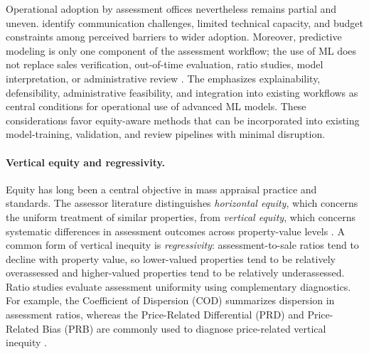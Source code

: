 \documentclass[10pt]{article}
\theoremstyle{definition}
\newcommand{\1}{\mathbf{1}}
\begin{document}
 {Operational adoption by assessment offices nevertheless remains partial and uneven.} \textcite{BidansetRakow2022} identify {communication challenges, limited technical capacity, and budget constraints among perceived barriers to wider adoption}. {Moreover, predictive modeling is only one component of the assessment workflow; the use of ML does not replace sales verification, out-of-time evaluation, ratio studies, model interpretation, or administrative review} \cite{IAAO2020SalesVerification,IAAOAITaskForce2022}. {The} \textcite{IAAOAITaskForce2022} emphasizes explainability, defensibility, administrative feasibility, and integration into existing workflows as central conditions for operational use of advanced ML models. {These considerations favor equity-aware methods that can be incorporated into existing model-training, validation, and review pipelines with minimal disruption.}

\paragraph{Vertical equity and regressivity.}
Equity has long been a central objective in mass appraisal practice and standards. The assessor literature distinguishes \emph{horizontal equity}, which concerns the uniform treatment of similar properties, from \emph{vertical equity}, which concerns systematic differences in assessment outcomes across property-value levels \cite{IAAO2013Ratio,cornia2006property,McMillenSingh2023}. A common form of vertical inequity is \emph{regressivity}: assessment-to-sale ratios tend to decline with property value, so lower-valued properties tend to be relatively overassessed and higher-valued properties tend to be relatively underassessed. {Ratio studies evaluate assessment uniformity using complementary diagnostics. For example, the Coefficient of Dispersion (COD) summarizes dispersion in assessment ratios, whereas the Price-Related Differential (PRD) and Price-Related Bias (PRB) are commonly used to diagnose price-related vertical inequity} \cite{IAAO2013Ratio,IAAO2023VerticalReview}.

\end{document}
